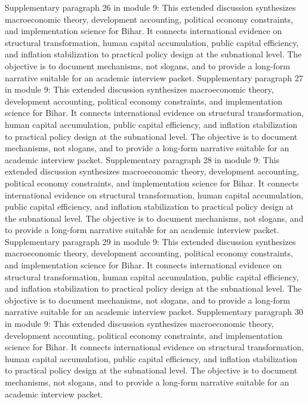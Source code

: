 \documentclass[preprint,12pt]{elsarticle}
\begin{document}
Supplementary paragraph 26 in module 9: This extended discussion synthesizes macroeconomic theory, development accounting, political economy constraints, and implementation science for Bihar. It connects international evidence on structural transformation, human capital accumulation, public capital efficiency, and inflation stabilization to practical policy design at the subnational level. The objective is to document mechanisms, not slogans, and to provide a long-form narrative suitable for an academic interview packet.
Supplementary paragraph 27 in module 9: This extended discussion synthesizes macroeconomic theory, development accounting, political economy constraints, and implementation science for Bihar. It connects international evidence on structural transformation, human capital accumulation, public capital efficiency, and inflation stabilization to practical policy design at the subnational level. The objective is to document mechanisms, not slogans, and to provide a long-form narrative suitable for an academic interview packet.
Supplementary paragraph 28 in module 9: This extended discussion synthesizes macroeconomic theory, development accounting, political economy constraints, and implementation science for Bihar. It connects international evidence on structural transformation, human capital accumulation, public capital efficiency, and inflation stabilization to practical policy design at the subnational level. The objective is to document mechanisms, not slogans, and to provide a long-form narrative suitable for an academic interview packet.
Supplementary paragraph 29 in module 9: This extended discussion synthesizes macroeconomic theory, development accounting, political economy constraints, and implementation science for Bihar. It connects international evidence on structural transformation, human capital accumulation, public capital efficiency, and inflation stabilization to practical policy design at the subnational level. The objective is to document mechanisms, not slogans, and to provide a long-form narrative suitable for an academic interview packet.
Supplementary paragraph 30 in module 9: This extended discussion synthesizes macroeconomic theory, development accounting, political economy constraints, and implementation science for Bihar. It connects international evidence on structural transformation, human capital accumulation, public capital efficiency, and inflation stabilization to practical policy design at the subnational level. The objective is to document mechanisms, not slogans, and to provide a long-form narrative suitable for an academic interview packet.
\end{document}
